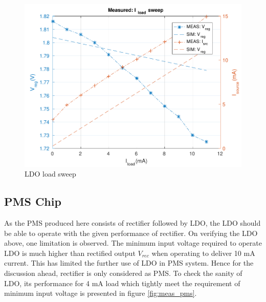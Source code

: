 \documentclass[12pt,a4paper,UKenglish]{report}
\begin{document}
\begin{figure} [H]
  \centering
  \includegraphics[width=\textwidth]{img/meas/ldo_iload_sweep.pdf} 
 \caption{LDO load sweep} 
\label{fig:meas_ldo_iload_sweep} 
\end{figure}



\subsection{PMS Chip} %

As the PMS produced here consists of rectifier followed by LDO, the LDO should be able to operate with the given performance of rectifier. On verifying the LDO above, one limitation is observed. The minimum input voltage required to operate LDO is much higher than rectified output $V_{rec}$ when operating to deliver 10 mA current. This has limited the further use of LDO in PMS system. Hence for the discussion ahead, rectifier is only considered as PMS. To check the sanity of LDO, its performance for 4 mA load which tightly meet the requirement of minimum input voltage is presented in figure  \ref{fig:meas_pms}.\\

\end{document}

